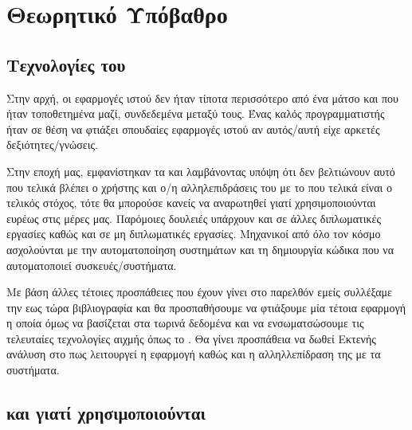 \chapter{Θεωρητικό Υπόβαθρο}

\section{Τεχνολογίες του }
Στην αρχή, οι εφαρμογές ιστού δεν ήταν τίποτα περισσότερο από ένα μάτσο  και
 που ήταν τοποθετημένα μαζί, συνδεδεμένα μεταξύ τους. Ένας καλός προγραμματιστής ήταν σε θέση να φτιάξει σπουδαίες εφαρμογές ιστού αν αυτός/αυτή
είχε αρκετές δεξιότητες/γνώσεις.

Στην εποχή μας, εμφανίστηκαν τα  και λαμβάνοντας υπόψη ότι δεν βελτιώνουν αυτό που τελικά βλέπει ο χρήστης και ο/η
αλληλεπιδράσεις του με το  που τελικά είναι ο τελικός στόχος, τότε
θα μπορούσε κανείς να αναρωτηθεί γιατί χρησιμοποιούνται ευρέως στις μέρες μας.
Παρόμοιες δουλειές υπάρχουν και σε άλλες διπλωματικές εργασίες καθώς και σε μη διπλωματικές εργασίες. Μηχανικοί από όλο τον κόσμο
ασχολούνται με την αυτοματοποίηση συστημάτων και τη δημιουργία κώδικα που να αυτοματοποιεί συσκευές/συστήματα. 

Με βάση άλλες τέτοιες προσπάθειες που έχουν γίνει στο παρελθόν εμείς συλλέξαμε την εως τώρα βιβλιογραφία
και θα προσπαθήσουμε να φτιάξουμε μία τέτοια εφαρμογή η οποία όμως να βασίζεται στα τωρινά δεδομένα και να 
ενσωματσώσουμε τις τελευταίες τεχνολογίες αιχμής όπως το . Θα γίνει προσπάθεια να δωθεί Εκτενής
ανάλυση στο πως λειτουργεί η εφαρμογή καθώς και η αλληλλεπίδραση της με τα συστήματα. 

\section{ και γιατί χρησιμοποιούνται}

